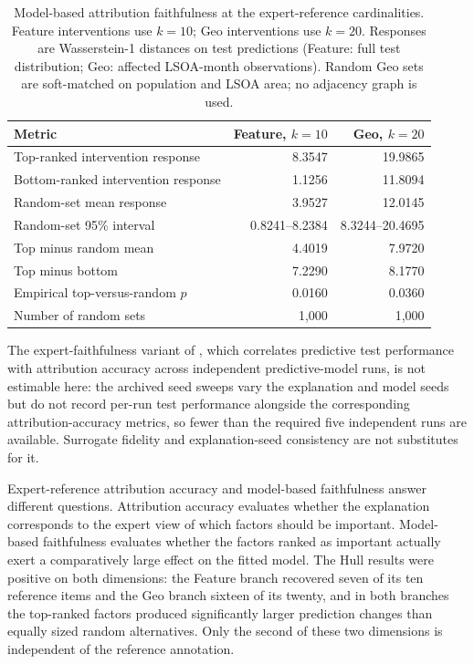 \begin{table}[H]
\centering
\caption{Model-based attribution faithfulness at the expert-reference cardinalities.
Feature interventions use $k=10$; Geo interventions use $k=20$.
Responses are Wasserstein-1 distances on test predictions (Feature: full test distribution; Geo: affected LSOA-month observations).
Random Geo sets are soft-matched on population and LSOA area; no adjacency graph is used.}
\label{tab:hull_faithfulness}
\small
\begin{tabularx}{\textwidth}{X r r}
\toprule
Metric & Feature, $k=10$ & Geo, $k=20$ \\
\midrule
Top-ranked intervention response & 8.3547 & 19.9865 \\
Bottom-ranked intervention response & 1.1256 & 11.8094 \\
Random-set mean response & 3.9527 & 12.0145 \\
Random-set 95\% interval & 0.8241--8.2384 & 8.3244--20.4695 \\
Top minus random mean & 4.4019 & 7.9720 \\
Top minus bottom & 7.2290 & 8.1770 \\
Empirical top-versus-random $p$ & 0.0160 & 0.0360 \\
Number of random sets & 1,000 & 1,000 \\
\bottomrule
\end{tabularx}
\end{table}

The expert-faithfulness variant of \citet{dehghani_smile_thesis}, which correlates predictive test performance with attribution accuracy across independent predictive-model runs, is not estimable here: the archived seed sweeps vary the explanation and model seeds but do not record per-run test performance alongside the corresponding attribution-accuracy metrics, so fewer than the required five independent runs are available. Surrogate fidelity and explanation-seed consistency are not substitutes for it.

Expert-reference attribution accuracy and model-based faithfulness answer different questions. Attribution accuracy evaluates whether the explanation corresponds to the expert view of which factors should be important. Model-based faithfulness evaluates whether the factors ranked as important actually exert a comparatively large effect on the fitted model. The Hull results were positive on both dimensions: the Feature branch recovered seven of its ten reference items and the Geo branch sixteen of its twenty, and in both branches the top-ranked factors produced significantly larger prediction changes than equally sized random alternatives. Only the second of these two dimensions is independent of the reference annotation.
\FloatBarrier


